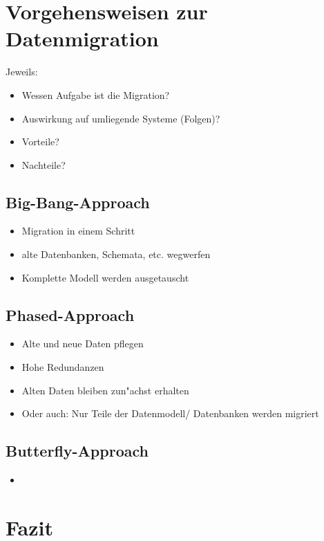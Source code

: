 \documentclass[11pt]{scrartcl}
\newif\iffull
\begin{document}
\section{Vorgehensweisen zur Datenmigration}		%

Jeweils:
\begin{itemize}
	\item Wessen Aufgabe ist die Migration?
	\item Auswirkung auf umliegende Systeme (Folgen)?
	\item Vorteile?
	\item Nachteile?
\end{itemize}

\subsection{Big-Bang-Approach}

\begin{itemize}
	\item Migration in einem Schritt
	\item alte Datenbanken, Schemata, etc. wegwerfen
	\item Komplette Modell werden ausgetauscht
\end{itemize}

\subsection{Phased-Approach}

\begin{itemize}
	\item Alte und neue Daten pflegen
	\item Hohe Redundanzen
	\item Alten Daten bleiben zun"achst erhalten
	\item Oder auch: Nur Teile der Datenmodell/ Datenbanken werden migriert
\end{itemize}

\subsection{Butterfly-Approach}

\begin{itemize}
	\item 
\end{itemize}

\section{Fazit}

\iffull
\newpage

%
\addcontentsline{toc}{section}{\bibname}


\fi
\end{document}
